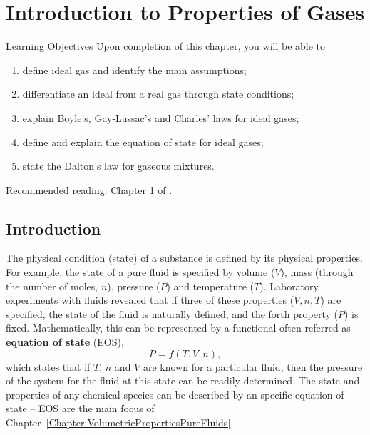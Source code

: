 
\chapter{Introduction to Properties of Gases}\label{Chapter:Intro_Property_of_Gases}

   \begin{LearningObjectivesBlock}{Learning Objectives}
      Upon completion of this chapter, you will be able to
        \begin{enumerate}
           \item define ideal gas and identify the main assumptions;
           \item differentiate an ideal from a real gas through state conditions;
           \item explain Boyle's, Gay-Lussac's and Charles' laws for ideal gases;
           \item define and explain the equation of state for ideal gases;
           \item state the Dalton's law for gaseous mixtures.
        \end{enumerate}
\medskip
     Recommended reading: Chapter 1 of \citet{Atkins_Book,Adamson_BookChapter}.
   \end{LearningObjectivesBlock}

   
     \section{Introduction}\label{Chapter:Intro_Property_of_Gases:Section:Intro}

   The physical condition (\ie state) of a substance is defined by its physical properties. For example, the state of a pure fluid is specified by volume ($V$), mass (through the number of moles, $n$), pressure ($P$) and temperature ($T$). Laboratory experiments with fluids revealed that if three of these properties (\eg $V, n, T$) are specified, the state of the fluid is naturally defined, and the forth property (\ie $P$) is fixed. Mathematically, this can be represented by a functional often referred as {\bf equation of state} (EOS),
     \begin{displaymath}
       P = f(T,V,n),
     \end{displaymath}
     which states that if $T$, $n$ and $V$ are known for a particular fluid, then the pressure of the system for the fluid at this state can be readily determined. The state and properties of any chemical species can be described by an specific equation of state -- EOS are the main focus of Chapter~\ref{Chapter:VolumetricPropertiesPureFluids}
   
